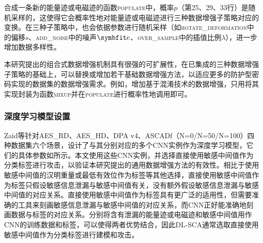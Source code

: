 {	合成一条新的能量迹或电磁迹的函数\textsc{populate}中，概率$p$（第25、29、33行）是随机采样的，这使得它会概率性地对能量迹或电磁迹进行三种数据增强子策略对应的变换。在三种子策略中，也会依据参数进行随机采样（如\textsc{rotate\_deformation}中的偏移$s$、\textsc{add\_noise}中的噪声$\Vector e$、\textsc{over\_sample}中的插值比例$\lambda$），进一步增加数据多样性。
	
	本研究提出的组合式数据增强机制具有很强的可扩展性，在已集成的三种数据增强子策略的基础上，可以替换或增加若干基础数据增强方法，以适应更多的防护型密码实现的数据集的数据增强需求。例如，增加基于混淆技术的数据增强，只用将其实现封装为函数\textsc{mixup}并在\textsc{populate}进行概率性地调用即可。
	\subsubsection{深度学习模型设置}
	Zaid等\citep{Zaid20}针对AES\_RD、AES\_HD、DPA v4、ASCADf（N=0/N=50/N=100）四种数据集六个场景，设计了与其分别对应的多个CNN实例作为深度学习模型，它们的具体参数如所示。本文使用这些CNN实例，并选择直接使用敏感中间值作为分类标签进行攻击，以验证本研究提出的通用数据增强方法的有效性。相比于使用敏感中间值的汉明重量或最低有效位作为标签等其他选择，直接使用敏感中间值作为标签只假设敏感信息泄漏与敏感中间值有关，没有额外假设敏感信息泄漏与敏感中间值的对应关系。直接使用敏感中间值作为标签具有更广泛的适用性，但需要准确的工具来刻画敏感信息泄漏与敏感中间值的对应关系，而CNN正好能准确地刻画数据与标签的对应关系。分别将含有泄漏的能量迹或电磁迹和敏感中间值用作CNN的训练数据和标签，可以使得两者优势结合，因此DL-SCA通常选取直接使用敏感中间值作为分类标签进行建模和攻击。
	
}
